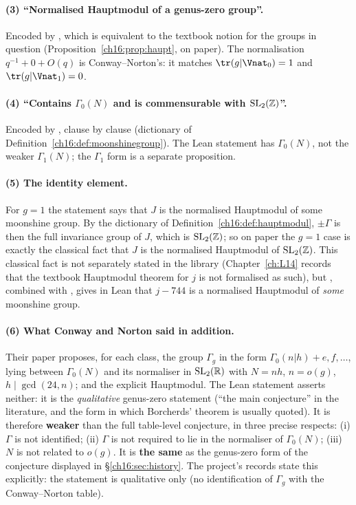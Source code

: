 \paragraph{(3) ``Normalised Hauptmodul of a genus-zero group''.}  Encoded by , which is
equivalent to the textbook notion for the groups in question (Proposition~\ref{ch16:prop:haupt}, on paper).  The
normalisation $q^{-1}+0+O(q)$ is Conway--Norton's: it matches $\tr(g|\Vnat_0)=1$ and $\tr(g|\Vnat_1)=0$.

\paragraph{(4) ``Contains $\Gamma_0(N)$ and is commensurable with $\mathrm{SL}_2(\mathbb{Z})$''.}  Encoded by
, clause by clause (dictionary of Definition~\ref{ch16:def:moonshinegroup}).  The Lean
statement has $\Gamma_0(N)$, not the weaker $\Gamma_1(N)$; the $\Gamma_1$ form is a separate proposition.

\paragraph{(5) The identity element.}  For $g=1$ the statement says that $J$ is the normalised Hauptmodul of some
moonshine group.  By the dictionary of Definition~\ref{ch16:def:hauptmodul}, $\pm\Gamma$ is then the full invariance
group of $J$, which is $\mathrm{SL}_2(\mathbb{Z})$; so on paper the $g=1$ case is exactly the classical fact that $J$ is the
normalised Hauptmodul of $\mathrm{SL}_2(\mathbb{Z})$.  This classical fact is not separately stated in the library
(Chapter~\ref{ch:L14} records that the textbook Hauptmodul theorem for $j$ is not formalised as such), but
, combined with , gives in Lean that $j-744$ is a normalised
Hauptmodul of \emph{some} moonshine group.

\paragraph{(6) What Conway and Norton said in addition.}  Their paper proposes, for each class, the group $\Gamma_g$ in
the form $\Gamma_0(n|h)+e,f,\dots$, lying between $\Gamma_0(N)$ and its normaliser in $\mathrm{SL}_2(\mathbb{R})$ with $N=nh$,
$n=o(g)$, $h\mid\gcd(24,n)$; and the explicit Hauptmodul.  The Lean statement asserts neither: it is the
\emph{qualitative} genus-zero statement (``the main conjecture'' in the literature, and the form in which Borcherds'
theorem is usually quoted).  It is therefore \textbf{weaker} than the full table-level conjecture, in three precise
respects: (i) $\Gamma$ is not identified; (ii) $\Gamma$ is not required to lie in the normaliser of $\Gamma_0(N)$;
(iii) $N$ is not related to $o(g)$.  It is \textbf{the same} as the genus-zero form of the conjecture displayed in
\S\ref{ch16:sec:history}.  The project's records state this explicitly: the statement is qualitative only (no identification of $\Gamma_g$ with the
Conway--Norton table).

